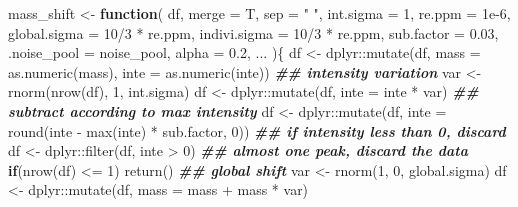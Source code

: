 \documentclass[
]{article}
\newenvironment{Shaded}{\begin{snugshade}}{\end{snugshade}}
\newcommand{\AttributeTok}[1]{\textcolor[rgb]{0.77,0.63,0.00}{#1}}
\newcommand{\ControlFlowTok}[1]{\textcolor[rgb]{0.13,0.29,0.53}{\textbf{#1}}}
\newcommand{\DecValTok}[1]{\textcolor[rgb]{0.00,0.00,0.81}{#1}}
\newcommand{\DocumentationTok}[1]{\textcolor[rgb]{0.56,0.35,0.01}{\textbf{\textit{#1}}}}
\newcommand{\FloatTok}[1]{\textcolor[rgb]{0.00,0.00,0.81}{#1}}
\newcommand{\FunctionTok}[1]{\textcolor[rgb]{0.00,0.00,0.00}{#1}}
\newcommand{\NormalTok}[1]{#1}
\newcommand{\OtherTok}[1]{\textcolor[rgb]{0.56,0.35,0.01}{#1}}
\newcommand{\SpecialCharTok}[1]{\textcolor[rgb]{0.00,0.00,0.00}{#1}}
\newcommand{\StringTok}[1]{\textcolor[rgb]{0.31,0.60,0.02}{#1}}
\begin{document}
\begin{Shaded}
\begin{Highlighting}[]
\NormalTok{mass\_shift }\OtherTok{\textless{}{-}} 
  \ControlFlowTok{function}\NormalTok{(}
\NormalTok{           df,}
           \AttributeTok{merge =}\NormalTok{ T,}
           \AttributeTok{sep =} \StringTok{" "}\NormalTok{,}
           \AttributeTok{int.sigma =} \DecValTok{1}\NormalTok{,}
           \AttributeTok{re.ppm =} \FloatTok{1e{-}6}\NormalTok{,}
           \AttributeTok{global.sigma =} \DecValTok{10}\SpecialCharTok{/}\DecValTok{3} \SpecialCharTok{*}\NormalTok{ re.ppm,}
           \AttributeTok{indivi.sigma =} \DecValTok{10}\SpecialCharTok{/}\DecValTok{3} \SpecialCharTok{*}\NormalTok{ re.ppm,}
           \AttributeTok{sub.factor =} \FloatTok{0.03}\NormalTok{,}
           \AttributeTok{.noise\_pool =}\NormalTok{ noise\_pool,}
           \AttributeTok{alpha =} \FloatTok{0.2}\NormalTok{,}
\NormalTok{           ...}
\NormalTok{           )\{}
\NormalTok{    df }\OtherTok{\textless{}{-}}\NormalTok{ dplyr}\SpecialCharTok{::}\FunctionTok{mutate}\NormalTok{(df, }\AttributeTok{mass =} \FunctionTok{as.numeric}\NormalTok{(mass), }\AttributeTok{inte =} \FunctionTok{as.numeric}\NormalTok{(inte))}
    \DocumentationTok{\#\# intensity variation}
\NormalTok{    var }\OtherTok{\textless{}{-}} \FunctionTok{rnorm}\NormalTok{(}\FunctionTok{nrow}\NormalTok{(df), }\DecValTok{1}\NormalTok{, int.sigma)}
\NormalTok{    df }\OtherTok{\textless{}{-}}\NormalTok{ dplyr}\SpecialCharTok{::}\FunctionTok{mutate}\NormalTok{(df, }\AttributeTok{inte =}\NormalTok{ inte }\SpecialCharTok{*}\NormalTok{ var)}
    \DocumentationTok{\#\# subtract according to max intensity}
\NormalTok{    df }\OtherTok{\textless{}{-}}\NormalTok{ dplyr}\SpecialCharTok{::}\FunctionTok{mutate}\NormalTok{(df, }\AttributeTok{inte =} \FunctionTok{round}\NormalTok{(inte }\SpecialCharTok{{-}} \FunctionTok{max}\NormalTok{(inte) }\SpecialCharTok{*}\NormalTok{ sub.factor, }\DecValTok{0}\NormalTok{))}
    \DocumentationTok{\#\# if intensity less than 0, discard}
\NormalTok{    df }\OtherTok{\textless{}{-}}\NormalTok{ dplyr}\SpecialCharTok{::}\FunctionTok{filter}\NormalTok{(df, inte }\SpecialCharTok{\textgreater{}} \DecValTok{0}\NormalTok{)}
    \DocumentationTok{\#\# almost one peak, discard the data}
    \ControlFlowTok{if}\NormalTok{(}\FunctionTok{nrow}\NormalTok{(df) }\SpecialCharTok{\textless{}=} \DecValTok{1}\NormalTok{)}
      \FunctionTok{return}\NormalTok{()}
    \DocumentationTok{\#\# global shift}
\NormalTok{    var }\OtherTok{\textless{}{-}} \FunctionTok{rnorm}\NormalTok{(}\DecValTok{1}\NormalTok{, }\DecValTok{0}\NormalTok{, global.sigma)}
\NormalTok{    df }\OtherTok{\textless{}{-}}\NormalTok{ dplyr}\SpecialCharTok{::}\FunctionTok{mutate}\NormalTok{(df, }\AttributeTok{mass =}\NormalTok{ mass }\SpecialCharTok{+}\NormalTok{ mass }\SpecialCharTok{*}\NormalTok{ var)}

\end{Highlighting}
\end{Shaded}
\end{document}
